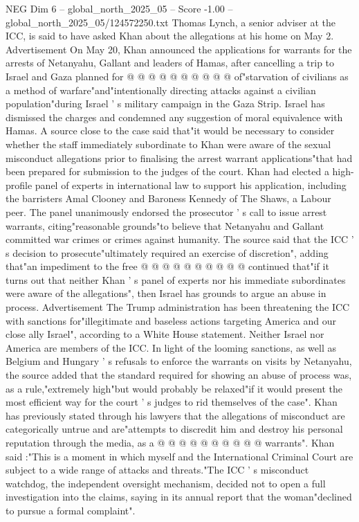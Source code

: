 \begin{textsample}{NEG Dim 6 – global\_north\_2025\_05 – Score -1.00 – global\_north\_2025\_05/124572250.txt}
Thomas Lynch, a senior adviser at the ICC, is said to have asked Khan about the allegations at his home on May 2.
Advertisement On May 20, Khan announced the applications for warrants for the arrests of Netanyahu, Gallant and leaders of Hamas, after cancelling a trip to Israel and Gaza planned for @ @ @ @ @ @ @ @ @ @ of"starvation of civilians as a method of warfare"and"intentionally directing attacks against a civilian population"during Israel ' s military campaign in the Gaza Strip.
Israel has dismissed the charges and condemned any suggestion of moral equivalence with Hamas.
A source close to the case said that"it would be necessary to consider whether the staff immediately subordinate to Khan were aware of the sexual misconduct allegations prior to finalising the arrest warrant applications"that had been prepared for submission to the judges of the court.
Khan had elected a high-profile panel of experts in international law to support his application, including the barristers Amal Clooney and Baroness Kennedy of The Shaws, a Labour peer.
The panel unanimously endorsed the prosecutor ' s call to issue arrest warrants, citing"reasonable grounds"to believe that Netanyahu and Gallant committed war crimes or crimes against humanity.
The source said that the ICC ' s decision to prosecute"ultimately required an exercise of discretion", adding that"an impediment to the free @ @ @ @ @ @ @ @ @ @ continued that"if it turns out that neither Khan ' s panel of experts nor his immediate subordinates were aware of the allegations", then Israel has grounds to argue an abuse in process.
Advertisement The Trump administration has been threatening the ICC with sanctions for"illegitimate and baseless actions targeting America and our close ally Israel", according to a White House statement.
Neither Israel nor America are members of the ICC.
In light of the looming sanctions, as well as Belgium and Hungary ' s refusals to enforce the warrants on visits by Netanyahu, the source added that the standard required for showing an abuse of process was, as a rule,"extremely high"but would probably be relaxed"if it would present the most efficient way for the court ' s judges to rid themselves of the case".
Khan has previously stated through his lawyers that the allegations of misconduct are categorically untrue and are"attempts to discredit him and destroy his personal reputation through the media, as a @ @ @ @ @ @ @ @ @ @ warrants".
Khan said :"This is a moment in which myself and the International Criminal Court are subject to a wide range of attacks and threats."The ICC ' s misconduct watchdog, the independent oversight mechanism, decided not to open a full investigation into the claims, saying in its annual report that the woman"declined to pursue a formal complaint".

\end{textsample}
